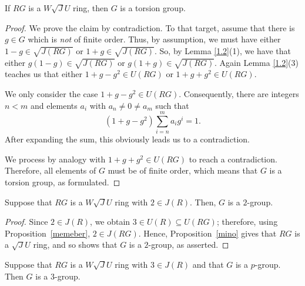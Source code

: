 \documentclass[12pt]{amsart}
\begin{document}
\begin{lemma} If $RG$ is a $W\sqrt{J}U$ ring, then $G$ is a torsion group. 
\end{lemma} 

\begin{proof} We prove the claim by contradiction. To that target, assume that there is $g \in G$ which is {\it not} of finite order. Thus, by assumption, we must have either $1-g \in \sqrt{J(RG)}$ or $1+g \in \sqrt{J(RG)}$. So, by Lemma \ref{1.2}(1), we have that either $g(1-g) \in \sqrt{J(RG)}$ or $g(1+g) \in \sqrt{J(RG)}$. Again Lemma \ref{1.2}(3) teaches us that either $1+g-g^2 \in U(RG)$ or $1+g+g^2 \in U(RG)$. 

We only consider the case $1 + g - g^2 \in U(RG)$. Consequently, there are integers $n < m$ and elements $a_i$ with $a_n \neq 0 \neq a_m$ such that \[ (1 + g - g^2)\sum_{i=n}^{m} a_ig^i = 1. \] After expanding the sum, this obviously leads us to a contradiction. 

We process by analogy with $1+g+g^2 \in U(RG)$ to reach a contradiction. Therefore, all elements of $G$ must be of finite order, which means that $G$ is a torsion group, as formulated.
\end{proof}

\begin{lemma}\label{2gr} Suppose that $RG$ is a $W\sqrt{J}U$ ring with $2 \in J(R)$. Then, $G$ is a $2$-group.
\end{lemma} 

\begin{proof} Since $2 \in J(R)$, we obtain $3 \in U(R) \subseteq U(RG)$; therefore, using 
Proposition~\ref{memeber}, $2 \in J(RG)$. Hence, Proposition~\ref{mino} gives that $RG$ is a $\sqrt{J}U$ ring, and so \cite[Theorem 4.4]{uq} shows that $G$ is a $2$-group, as asserted. 
\end{proof}

\begin{lemma}\label{3gr} Suppose that $RG$ is a $W\sqrt{J}U$ ring with $3 \in J(R)$ and that $G$ is a $p$-group. Then $G$ is a $3$-group. 
\end{lemma} 
\end{document}
